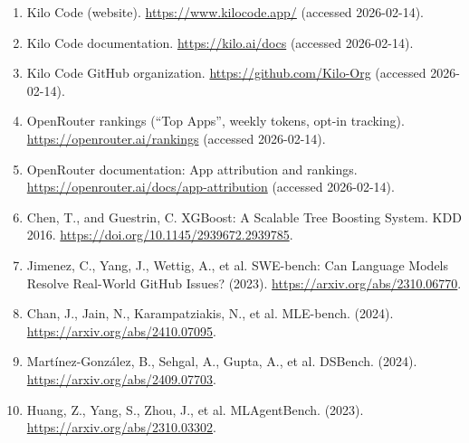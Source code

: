 \begin{enumerate}
  \item Kilo Code (website). \url{https://www.kilocode.app/} (accessed 2026-02-14).
  \item Kilo Code documentation. \url{https://kilo.ai/docs} (accessed 2026-02-14).
  \item Kilo Code GitHub organization. \url{https://github.com/Kilo-Org} (accessed 2026-02-14).
  \item OpenRouter rankings (``Top Apps'', weekly tokens, opt-in tracking). \url{https://openrouter.ai/rankings} (accessed 2026-02-14).
  \item OpenRouter documentation: App attribution and rankings. \url{https://openrouter.ai/docs/app-attribution} (accessed 2026-02-14).
  \item Chen, T., and Guestrin, C. XGBoost: A Scalable Tree Boosting System. KDD 2016. \url{https://doi.org/10.1145/2939672.2939785}.
  \item Jimenez, C., Yang, J., Wettig, A., et al. SWE-bench: Can Language Models Resolve Real-World GitHub Issues? (2023). \url{https://arxiv.org/abs/2310.06770}.
  \item Chan, J., Jain, N., Karampatziakis, N., et al. MLE-bench. (2024). \url{https://arxiv.org/abs/2410.07095}.
  \item Mart\'{i}nez-Gonz\'{a}lez, B., Sehgal, A., Gupta, A., et al. DSBench. (2024). \url{https://arxiv.org/abs/2409.07703}.
  \item Huang, Z., Yang, S., Zhou, J., et al. MLAgentBench. (2023). \url{https://arxiv.org/abs/2310.03302}.
\end{enumerate}
